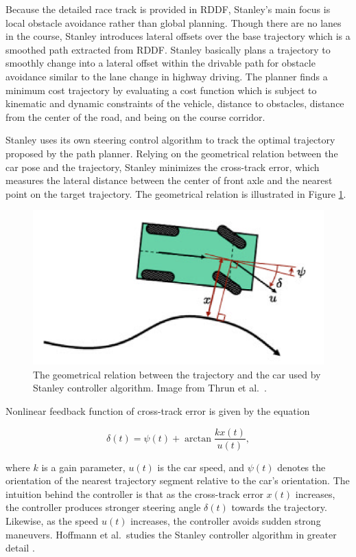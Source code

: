 Because the detailed race track is provided in RDDF, Stanley's main focus is
local obstacle avoidance rather than global planning. Though there are no lanes
in the course, Stanley introduces lateral offsets over the base trajectory
which is a smoothed path extracted from RDDF. Stanley basically plans a
trajectory to smoothly change into a lateral offset within the drivable path
for obstacle avoidance similar to the lane change in highway driving. The
planner finds a minimum cost trajectory by evaluating a cost function which is
subject to kinematic and dynamic constraints of the vehicle, distance to
obstacles, distance from the center of the road, and being on the course
corridor.

Stanley uses its own steering control algorithm to track the optimal trajectory
proposed by the path planner. Relying on the geometrical relation between the
car pose and the trajectory, Stanley minimizes the cross-track error, which
measures the lateral distance between the center of front axle and the nearest
point on the target trajectory. The geometrical relation is illustrated in
Figure \ref{figure:stanley-control}.

\begin{figure}[h]
  \centering
  \includegraphics[width=.8\textwidth]{figures/stanley-control.png}
  \caption[Stanley controller algorithm]{The geometrical relation between the
    trajectory and the car used by Stanley controller algorithm. Image from
    Thrun et al.\ \cite{Thrun2006StanleyTR}.}
  \label{figure:stanley-control}
\end{figure}

Nonlinear feedback function of cross-track error is given by the equation

\begin{equation}
  \delta(t) = \psi(t) + \arctan\frac{kx(t)}{u(t)},
  \label{eq:stanley-control}
\end{equation}

where $k$ is a gain parameter, $u(t)$ is the car speed, and $\psi(t)$ denotes
the orientation of the nearest trajectory segment relative to the car's
orientation. The intuition behind the controller is that as the cross-track
error $x(t)$ increases, the controller produces stronger steering angle
$\delta(t)$ towards the trajectory. Likewise, as the speed $u(t)$ increases,
the controller avoids sudden strong maneuvers. Hoffmann et al.\ studies the
Stanley controller algorithm in greater detail \cite{Hoffmann2007AutonomousAT}.


